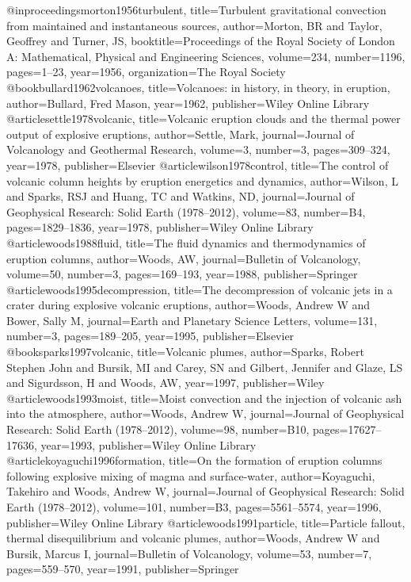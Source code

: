 @inproceedings{morton1956turbulent,
  title={Turbulent gravitational convection from maintained and instantaneous sources},
  author={Morton, BR and Taylor, Geoffrey and Turner, JS},
  booktitle={Proceedings of the Royal Society of London A: Mathematical, Physical and Engineering Sciences},
  volume={234},
  number={1196},
  pages={1--23},
  year={1956},
  organization={The Royal Society}
}
@book{bullard1962volcanoes,
  title={Volcanoes: in history, in theory, in eruption},
  author={Bullard, Fred Mason},
  year={1962},
  publisher={Wiley Online Library}
}
@article{settle1978volcanic,
  title={Volcanic eruption clouds and the thermal power output of explosive eruptions},
  author={Settle, Mark},
  journal={Journal of Volcanology and Geothermal Research},
  volume={3},
  number={3},
  pages={309--324},
  year={1978},
  publisher={Elsevier}
}
@article{wilson1978control,
  title={The control of volcanic column heights by eruption energetics and dynamics},
  author={Wilson, L and Sparks, RSJ and Huang, TC and Watkins, ND},
  journal={Journal of Geophysical Research: Solid Earth (1978--2012)},
  volume={83},
  number={B4},
  pages={1829--1836},
  year={1978},
  publisher={Wiley Online Library}
}
@article{woods1988fluid,
  title={The fluid dynamics and thermodynamics of eruption columns},
  author={Woods, AW},
  journal={Bulletin of Volcanology},
  volume={50},
  number={3},
  pages={169--193},
  year={1988},
  publisher={Springer}
}
@article{woods1995decompression,
  title={The decompression of volcanic jets in a crater during explosive volcanic eruptions},
  author={Woods, Andrew W and Bower, Sally M},
  journal={Earth and Planetary Science Letters},
  volume={131},
  number={3},
  pages={189--205},
  year={1995},
  publisher={Elsevier}
}
@book{sparks1997volcanic,
  title={Volcanic plumes},
  author={Sparks, Robert Stephen John and Bursik, MI and Carey, SN and Gilbert, Jennifer and Glaze, LS and Sigurdsson, H and Woods, AW},
  year={1997},
  publisher={Wiley}
}
@article{woods1993moist,
  title={Moist convection and the injection of volcanic ash into the atmosphere},
  author={Woods, Andrew W},
  journal={Journal of Geophysical Research: Solid Earth (1978--2012)},
  volume={98},
  number={B10},
  pages={17627--17636},
  year={1993},
  publisher={Wiley Online Library}
}
@article{koyaguchi1996formation,
  title={On the formation of eruption columns following explosive mixing of magma and surface-water},
  author={Koyaguchi, Takehiro and Woods, Andrew W},
  journal={Journal of Geophysical Research: Solid Earth (1978--2012)},
  volume={101},
  number={B3},
  pages={5561--5574},
  year={1996},
  publisher={Wiley Online Library}
}
@article{woods1991particle,
  title={Particle fallout, thermal disequilibrium and volcanic plumes},
  author={Woods, Andrew W and Bursik, Marcus I},
  journal={Bulletin of Volcanology},
  volume={53},
  number={7},
  pages={559--570},
  year={1991},
  publisher={Springer}
}


